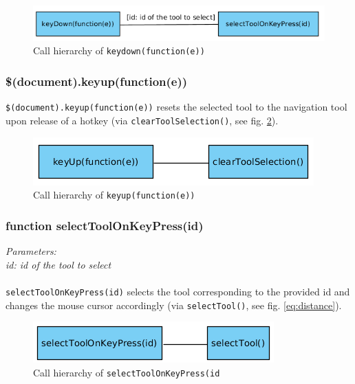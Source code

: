 \begin{figure}[H]
	\begin{center}
		\includegraphics[scale=0.5]{img/ch_keyDown.png}
		\caption{Call hierarchy of \texttt{keydown(function(e))}}
		\label{figB_keyDown}
	\end{center}
\end{figure}
	

\subsubsection{\$(document).keyup(function(e))}
\texttt{\$(document).keyup(function(e))} resets the selected tool to the navigation tool upon release of a hotkey (via \texttt{clearToolSelection()}, see fig. \ref{figB_keyup}).

\begin{figure}[H]
	\begin{center}
		\includegraphics[scale=0.5]{img/ch_keyup.png}
		\caption{Call hierarchy of \texttt{keyup(function(e))}}
		\label{figB_keyup}
	\end{center}
\end{figure}


\subsubsection{function selectToolOnKeyPress(id)}
\emph{Parameters:\\
	id: id of the tool to select\\ \\
}
\texttt{selectToolOnKeyPress(id)} selects the tool corresponding to the provided id and changes the mouse cursor accordingly (via \texttt{selectTool()}, see fig. \ref{eq:distance}).

\begin{figure}[H]
	\begin{center}
		\includegraphics[scale=0.5]{img/ch_selectToolOnKeyPress.png}
		\caption{Call hierarchy of \texttt{selectToolOnKeyPress(id}}
		\label{figB_selectToolOnKeyPress}
	\end{center}
\end{figure}

